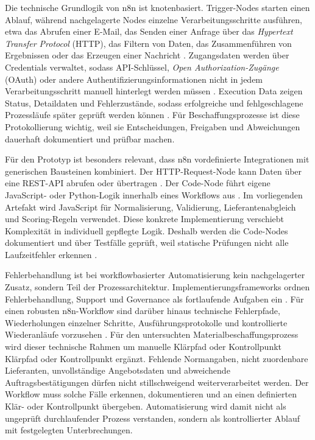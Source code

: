 \documentclass[a4paper,12pt]{article}
\begin{document}
Die technische Grundlogik von n8n ist knotenbasiert. Trigger-Nodes starten einen Ablauf, während nachgelagerte Nodes einzelne Verarbeitungsschritte ausführen, etwa das Abrufen einer E-Mail, das Senden einer Anfrage über das \textit{Hypertext Transfer Protocol} (HTTP), das Filtern von Daten, das Zusammenführen von Ergebnissen oder das Erzeugen einer Nachricht \parencite{n8n_docs_2026}. Zugangsdaten werden über Credentials verwaltet, sodass API-Schlüssel, \textit{Open Authorization-Zugänge} (OAuth) oder andere Authentifizierungsinformationen nicht in jedem Verarbeitungsschritt manuell hinterlegt werden müssen \parencite{edjekoomhene_entwicklung_2024,n8n_docs_2026}. Execution Data zeigen Status, Detaildaten und Fehlerzustände, sodass erfolgreiche und fehlgeschlagene Prozessläufe später geprüft werden können \parencite{n8n_docs_2026}. Für Beschaffungsprozesse ist diese Protokollierung wichtig, weil sie Entscheidungen, Freigaben und Abweichungen dauerhaft dokumentiert und prüfbar machen.

Für den Prototyp ist besonders relevant, dass n8n vordefinierte Integrationen mit generischen Bausteinen kombiniert. Der HTTP-Request-Node kann Daten über eine REST-API abrufen oder übertragen \parencite{n8n_docs_2026}. Der Code-Node führt eigene JavaScript- oder Python-Logik innerhalb eines Workflows aus \parencite{n8n_docs_2026}. Im vorliegenden Artefakt wird JavaScript für Normalisierung, Validierung, Lieferantenabgleich und Scoring-Regeln verwendet. Diese konkrete Implementierung verschiebt Komplexität in individuell gepflegte Logik. Deshalb werden die Code-Nodes dokumentiert und über Testfälle geprüft, weil statische Prüfungen nicht alle Laufzeitfehler erkennen \parencite{edjekoomhene_entwicklung_2024}.

Fehlerbehandlung ist bei workflowbasierter Automatisierung kein nachgelagerter Zusatz, sondern Teil der Prozessarchitektur. Implementierungsframeworks ordnen Fehlerbehandlung, Support und Governance als fortlaufende Aufgaben ein \parencite{herm_framework_2023}. Für einen robusten n8n-Workflow sind darüber hinaus technische Fehlerpfade, Wiederholungen einzelner Schritte, Ausführungsprotokolle und kontrollierte Wiederanläufe vorzusehen \parencite{n8n_docs_2026}. Für den untersuchten Materialbeschaffungsprozess wird dieser technische Rahmen um manuelle Klärpfad oder Kontrollpunkt Klärpfad oder Kontrollpunkt ergänzt. Fehlende Normangaben, nicht zuordenbare Lieferanten, unvollständige Angebotsdaten und abweichende Auftragsbestätigungen dürfen nicht stillschweigend weiterverarbeitet werden. Der Workflow muss solche Fälle erkennen, dokumentieren und an einen definierten Klär- oder Kontrollpunkt übergeben. Automatisierung wird damit nicht als ungeprüft durchlaufender Prozess verstanden, sondern als kontrollierter Ablauf mit festgelegten Unterbrechungen.
\end{document}
